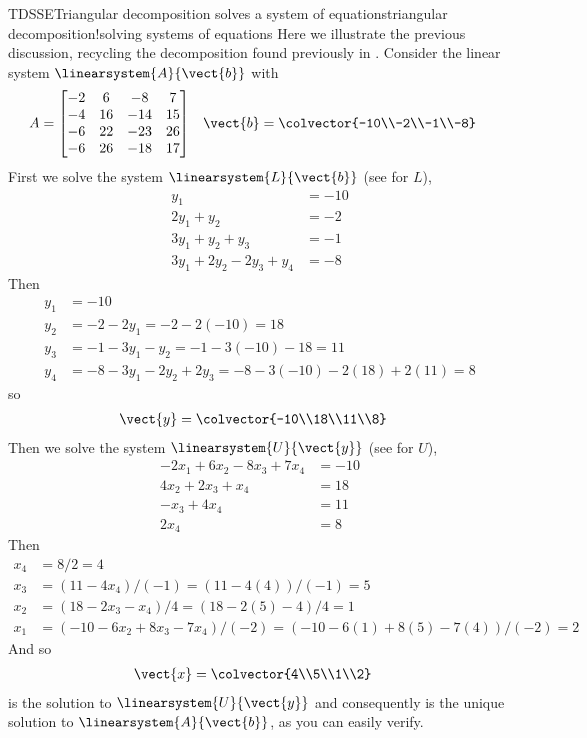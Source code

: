 \begin{example}{TDSSE}{Triangular decomposition solves a system of equations}{triangular decomposition!solving systems of equations}
Here we illustrate the previous discussion, recycling the decomposition found previously in .  Consider the linear system $\linearsystem{A}{\vect{b}}$ with
%
\begin{align*}
A&=
\begin{bmatrix}
 -2 & 6 & -8 & 7 \\
 -4 & 16 & -14 & 15 \\
 -6 & 22 & -23 & 26 \\
 -6 & 26 & -18 & 17
\end{bmatrix}
&
\vect{b}
&=\colvector{-10\\-2\\-1\\-8}
\end{align*}
%
First we solve the system $\linearsystem{L}{\vect{b}}$ (see  for $L$),
%
\begin{align*}
y_1 &= -10\\
2y_1 + y_2 &= -2\\
3y_1 + y_2 + y_3 &= -1\\
3y_1 + 2y_2 - 2y_3 + y_4 &= -8
\end{align*}
%
Then
%
\begin{align*}
y_1 &= -10\\
y_2 &= -2-2y_1=-2-2(-10)=18\\
y_3 &= -1-3y_1 - y_2 =-1-3(-10)-18=11\\
y_4 &= -8-3y_1 - 2y_2 + 2y_3 = -8-3(-10)-2(18)+2(11)=8
\end{align*}
%
so
%
\begin{align*}
\vect{y}&=\colvector{-10\\18\\11\\8}
\end{align*}
%
Then we solve the system $\linearsystem{U}{\vect{y}}$ (see  for $U$),
%
\begin{align*}
-2x_1 + 6x_2 - 8x_3 + 7x_4 &=-10\\
4x_2 + 2x_3 +x_4 &=18\\
-x_3 + 4x_4 &= 11\\
2x_4 &=8
\end{align*}
%
Then
%
\begin{align*}
x_4&=8/2=4 \\
x_3 &= \left(11-4x_4\right)/(-1)=\left(11-4(4)\right)/(-1)=5\\
x_2 &= \left(18-2x_3-x_4\right)/4= \left(18-2(5)-4\right)/4=1\\
x_1 &= \left(-10-6x_2+8x_3-7x_4\right)/(-2)=\left(-10-6(1)+8(5)-7(4)\right)/(-2)=2
\end{align*}
%
And so
%
\begin{align*}
\vect{x}&=\colvector{4\\5\\1\\2}
\end{align*}
%
is the solution to $\linearsystem{U}{\vect{y}}$ and consequently is the unique solution to $\linearsystem{A}{\vect{b}}$, as you can easily verify.
%
\end{example}
